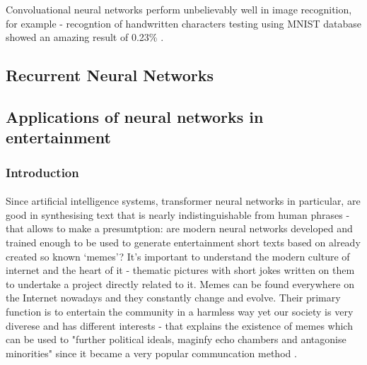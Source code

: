 \documentclass[12pt]{report}
\begin{document}
    Convoluational neural networks perform unbelievably well in image recognition, for example - recogntion of handwritten characters testing using MNIST database showed an amazing result of 0.23\% \citep{image_classification_article}.

    \subsection*{Recurrent Neural Networks}
    \paragraph{}

    \subsection*{Applications of neural networks in entertainment}

    \subsubsection*{Introduction}
    \paragraph{}

    Since artificial intelligence systems, transformer neural networks in particular, are good in synthesising text that is nearly indistinguishable from human phrases - that allows to make a presumtption: are modern neural networks developed and trained enough to be used to generate
    entertainment short texts based on already created so known `memes'? It's important to understand the modern culture of internet and the heart of it - thematic pictures with short jokes written on them to undertake a project directly related to it.
    Memes can be found everywhere on the Internet nowadays and they constantly change and evolve. Their primary function is to entertain the community in a harmless way yet our society is very diverese and has different interests - that explains the existence of memes which can be used
    to "further political ideals, maginfy echo chambers and antagonise minorities" since it became a very popular communcation method \citep{dank_learning}. 
\end{document}
